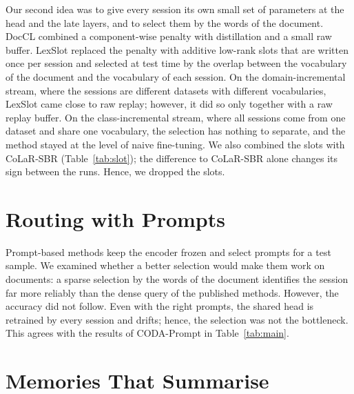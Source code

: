 Our second idea was to give every session its own small set of parameters at the head and
the late layers, and to select them by the words of the document. DocCL combined a
component-wise penalty with distillation and a small raw buffer. LexSlot replaced the
penalty with additive low-rank slots that are written once per session and selected at
test time by the overlap between the vocabulary of the document and the vocabulary of
each session. On the domain-incremental stream, where the sessions are different datasets
with different vocabularies, LexSlot came close to raw replay; however, it did so only
together with a raw replay buffer. On the class-incremental stream, where all sessions
come from one dataset and share one vocabulary, the selection has nothing to separate, and
the method stayed at the level of naive fine-tuning. We also combined the slots with
CoLaR-SBR (Table~\ref{tab:slot}); the difference to CoLaR-SBR alone changes its sign
between the runs. Hence, we dropped the slots.

\begin{table}[!htbp]
  \centering
  \caption[CoLaR-SBR with and without lexical slots]{\textbf{CoLaR-SBR with and without
  lexical slots} (AA per run: without / with, and the difference; earlier
  protocol$^{\dagger}$; ``--'': not run).}
  \label{tab:slot}
  \small
\end{table}

\section{Routing with Prompts}
\label{app:earlier-routing}

Prompt-based methods keep the encoder frozen and select prompts for a test sample. We
examined whether a better selection would make them work on documents: a sparse selection
by the words of the document identifies the session far more reliably than the dense
query of the published methods. However, the accuracy did not follow. Even with the right
prompts, the shared head is retrained by every session and drifts; hence, the selection
was not the bottleneck. This agrees with the results of CODA-Prompt in
Table~\ref{tab:main}.

\section{Memories That Summarise}
\label{app:earlier-summary}


